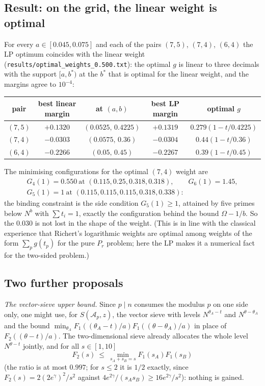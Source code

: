 \documentclass[11pt,a4paper]{article}
\theoremstyle{remark}
\theoremstyle{definition}
\newcommand{\cA}{\mathcal A}
\begin{document}
\subsection{Result: on the grid, the linear weight is optimal}
For every $a\in[0.045,0.075]$ and each of the pairs $(7,5)$, $(7,4)$, $(6,4)$ the LP optimum coincides with the linear weight (\texttt{results/optimal\_weights\_0.500.txt}): the optimal $g$ is linear to three decimals with the support $[a,b^*)$ at the $b^*$ that is optimal for the linear weight, and the margins agree to $10^{-4}$:
\begin{center}\small
\begin{tabular}{c|cc|cc}
\toprule
pair & best linear margin & at $(a,b)$ & best LP margin & optimal $g$\\
\midrule
$(7,5)$ & $+0.1320$ & $(0.0525,\,0.4225)$ & $+0.1319$ & $0.279(1-t/0.4225)$\\
$(7,4)$ & $-0.0303$ & $(0.0575,\,0.36)$ & $-0.0304$ & $0.44(1-t/0.36)$\\
$(6,4)$ & $-0.2266$ & $(0.05,\,0.45)$ & $-0.2267$ & $0.39(1-t/0.45)$\\
\bottomrule
\end{tabular}
\end{center}
The minimising configurations for the optimal $(7,4)$ weight are
\begin{gather*}
G_4(1)=0.550\ \text{at }(0.115,0.25,0.318,0.318),\qquad G_6(1)=1.45,\\ G_5(1)=1\ \text{at }(0.115,0.115,0.115,0.318,0.338):
\end{gather*}
the binding constraint is the side condition $G_5(1)\ge1$, attained by five primes below $N^{b}$ with $\sum t_i=1$, exactly the configuration behind the bound $\Omega-1/b$. So the $0.030$ is not lost in the shape of the weight. (This is in line with the classical experience that Richert's logarithmic weights are optimal among weights of the form $\sum_{p}g(t_p)$ for the pure $P_r$ problem; here the LP makes it a numerical fact for the two-sided problem.)

\subsection{Two further proposals}
\emph{The vector-sieve upper bound.} Since $p\mid n$ consumes the modulus $p$ on one side only, one might use, for $S(\cA_p,z)$, the vector sieve with levels $N^{\theta_A-t}$ and $N^{\theta-\theta_A}$ and the bound $\min_{\theta_A}F_1((\theta_A-t)/a)F_1((\theta-\theta_A)/a)$ in place of $F_2((\theta-t)/a)$. The two-dimensional sieve already allocates the whole level $N^{\theta-t}$ jointly, and for all $s\in[1,10]$
\[
F_2(s)\ \le\ \min_{s_A+s_B=s}F_1(s_A)F_1(s_B)
\]
(the ratio is at most $0.997$; for $s\le2$ it is $1/2$ exactly, since $F_2(s)=2(2e^\gamma)^2/s^2$ against $4e^{2\gamma}/(s_As_B)\ge16e^{2\gamma}/s^2$): nothing is gained.
\end{document}
